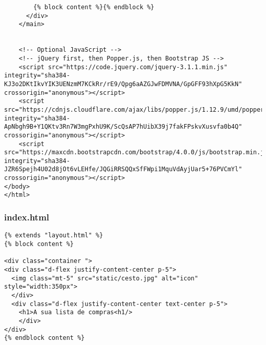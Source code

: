 \documentclass{report}
\begin{document}
\begin{lstlisting}
        {% block content %}{% endblock %}
      </div>
    </main>


    <!-- Optional JavaScript -->
    <!-- jQuery first, then Popper.js, then Bootstrap JS -->
    <script src="https://code.jquery.com/jquery-3.1.1.min.js" integrity="sha384-KJ3o2DKtIkvYIK3UENzmM7KCkRr/rE9/Qpg6aAZGJwFDMVNA/GpGFF93hXpG5KkN" crossorigin="anonymous"></script>
    <script src="https://cdnjs.cloudflare.com/ajax/libs/popper.js/1.12.9/umd/popper.min.js" integrity="sha384-ApNbgh9B+Y1QKtv3Rn7W3mgPxhU9K/ScQsAP7hUibX39j7fakFPskvXusvfa0b4Q" crossorigin="anonymous"></script>
    <script src="https://maxcdn.bootstrapcdn.com/bootstrap/4.0.0/js/bootstrap.min.js" integrity="sha384-JZR6Spejh4U02d8jOt6vLEHfe/JQGiRRSQQxSfFWpi1MquVdAyjUar5+76PVCmYl" crossorigin="anonymous"></script>
</body>
</html>
\end{lstlisting}


\subsubsection{index.html}
\begin{lstlisting}
{% extends "layout.html" %}
{% block content %}

<div class="container ">
<div class="d-flex justify-content-center p-5">
  <img class="mt-5" src="static/cesto.jpg" alt="icon" style="width:350px">
  </div>
  <div class="d-flex justify-content-center text-center p-5">
    <h1>A sua lista de compras<h1/>
    </div>
</div>
{% endblock content %}
\end{lstlisting}
\end{document}
